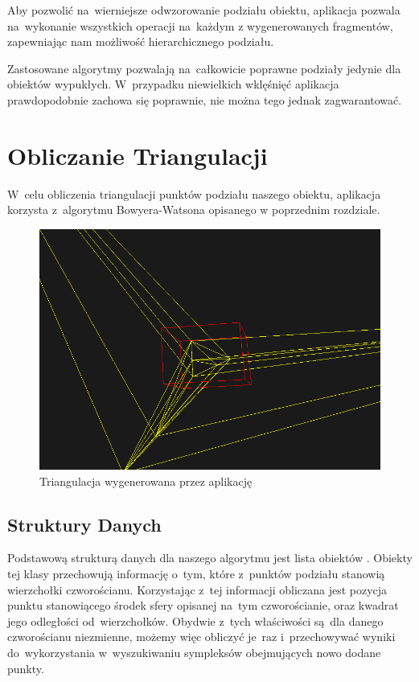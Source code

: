 \documentclass[skorowidz,autorrok,backref,xodstep,oswiadczenie]{wmimgr}
\begin{document}
Aby pozwolić na~wierniejsze odwzorowanie podziału obiektu, aplikacja pozwala na~wykonanie wszystkich operacji na~każdym z wygenerowanych fragmentów, zapewniając nam możliwość hierarchicznego podziału.

Zastosowane algorytmy pozwalają na~całkowicie poprawne podziały jedynie dla obiektów wypukłych. W~przypadku niewielkich wklęśnięć aplikacja prawdopodobnie zachowa się poprawnie, nie można tego jednak zagwarantować.

\section{Obliczanie Triangulacji}

W~celu obliczenia triangulacji punktów podziału naszego obiektu, aplikacja korzysta z~algorytmu Bowyera-Watsona opisanego w poprzednim rozdziale.

\begin{figure}[ht!]
\centering
\includegraphics[width=140mm]{images/app1.png}
\caption{Triangulacja wygenerowana przez aplikację}
\label{apptriangulation}
\end{figure}

\subsection{Struktury Danych}

Podstawową strukturą danych dla naszego algorytmu jest lista obiektów . Obiekty tej klasy przechowują informację o~tym, które z~punktów podziału stanowią wierzchołki czworościanu. Korzystając z~tej informacji obliczana jest pozycja punktu stanowiącego środek sfery opisanej na~tym czworościanie, oraz kwadrat jego odległości od~wierzchołków. Obydwie z~tych właściwości są~dla danego czworościanu niezmienne, możemy więc obliczyć je~raz i~przechowywać wyniki do~wykorzystania w~wyszukiwaniu sympleksów obejmujących nowo dodane punkty.
\end{document}
